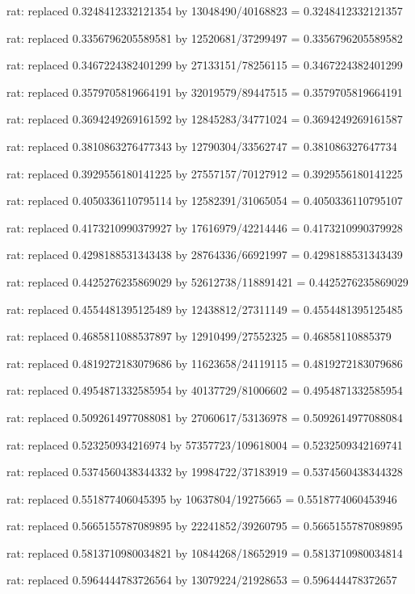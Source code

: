 \documentclass[a4paper,10pt]{article}
\begin{document}
\begin{eulernotebook}
\begin{eulercomment}
\begin{eulercomment}
\begin{eulercomment}
\begin{eulercomment}
\begin{eulercomment}
\begin{eulercomment}
\begin{eulercomment}
\begin{eulercomment}
\begin{eulercomment}
\begin{eulercomment}
\begin{eulercomment}
\begin{eulercomment}
\begin{eulercomment}
\begin{eulercomment}
\begin{eulercomment}
\begin{eulercomment}
\begin{euleroutput}
  rat: replaced 0.3248412332121354 by 13048490/40168823 = 0.3248412332121357
  
  rat: replaced 0.3356796205589581 by 12520681/37299497 = 0.3356796205589582
  
  rat: replaced 0.3467224382401299 by 27133151/78256115 = 0.3467224382401299
  
  rat: replaced 0.3579705819664191 by 32019579/89447515 = 0.3579705819664191
  
  rat: replaced 0.3694249269161592 by 12845283/34771024 = 0.3694249269161587
  
  rat: replaced 0.3810863276477343 by 12790304/33562747 = 0.381086327647734
  
  rat: replaced 0.3929556180141225 by 27557157/70127912 = 0.3929556180141225
  
  rat: replaced 0.4050336110795114 by 12582391/31065054 = 0.4050336110795107
  
  rat: replaced 0.4173210990379927 by 17616979/42214446 = 0.4173210990379928
  
  rat: replaced 0.4298188531343438 by 28764336/66921997 = 0.4298188531343439
  
  rat: replaced 0.4425276235869029 by 52612738/118891421 = 0.4425276235869029
  
  rat: replaced 0.4554481395125489 by 12438812/27311149 = 0.4554481395125485
  
  rat: replaced 0.4685811088537897 by 12910499/27552325 = 0.46858110885379
  
  rat: replaced 0.4819272183079686 by 11623658/24119115 = 0.4819272183079686
  
  rat: replaced 0.4954871332585954 by 40137729/81006602 = 0.4954871332585954
  
  rat: replaced 0.5092614977088081 by 27060617/53136978 = 0.5092614977088084
  
  rat: replaced 0.523250934216974 by 57357723/109618004 = 0.5232509342169741
  
  rat: replaced 0.5374560438344332 by 19984722/37183919 = 0.5374560438344328
  
  rat: replaced 0.551877406045395 by 10637804/19275665 = 0.5518774060453946
  
  rat: replaced 0.5665155787089895 by 22241852/39260795 = 0.5665155787089895
  
  rat: replaced 0.5813710980034821 by 10844268/18652919 = 0.5813710980034814
  
  rat: replaced 0.5964444783726564 by 13079224/21928653 = 0.596444478372657
  

\end{euleroutput}
\end{eulercomment}
\end{eulercomment}
\end{eulercomment}
\end{eulercomment}
\end{eulercomment}
\end{eulercomment}
\end{eulercomment}
\end{eulercomment}
\end{eulercomment}
\end{eulercomment}
\end{eulercomment}
\end{eulercomment}
\end{eulercomment}
\end{eulercomment}
\end{eulercomment}
\end{eulercomment}
\end{eulernotebook}
\end{document}
